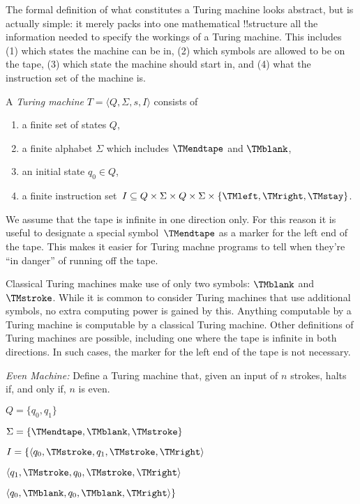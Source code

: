 \documentclass[../../include/open-logic-section]{subfiles}
\begin{document}

\begin{explain}
The formal definition of what constitutes a Turing machine looks
abstract, but is actually simple: it merely packs into one
mathematical !!{structure} all the information needed to specify the
workings of a Turing machine. This includes (1) which states the
machine can be in, (2) which symbols are allowed to be on the tape, (3)
which state the machine should start in, and (4) what the instruction
set of the machine is.
\end{explain}

\begin{defn}
A \emph{Turing machine} $T = \langle Q, \Sigma, s, I\rangle$ consists of
\begin{enumerate}
\item a finite set of states $Q$,
\item a finite alphabet $\Sigma$ which includes $\TMendtape$ and
  $\TMblank$,
\item an initial state $q_0 \in Q$,
\item a finite instruction set~$I \subseteq Q \times \Sigma \times Q
  \times \Sigma \times \{\TMleft, \TMright, \TMstay\}$.
\end{enumerate}
\end{defn}

\begin{explain}
We assume that the tape is infinite in one direction only. For this
reason it is useful to designate a special symbol~$\TMendtape$ as
a marker for the left end of the tape. This makes it easier for
Turing machne programs to tell when they're ``in danger'' of running
off the tape. 

Classical Turing machines make use of only two symbols: $\TMblank$ and
$\TMstroke$. While it is common to consider Turing machines that use additional
symbols, no extra computing power is gained by this. Anything computable by
a Turing machine is computable by a classical Turing machine. Other
definitions of Turing machines are possible,
including one where the tape is infinite in both directions. In such cases,
the marker for the left end of the tape is not necessary.
\end{explain}

\begin{ex}
\emph{Even Machine:} Define a Turing machine that, given an input of $n$
strokes, halts if, and only if, $n$ is even.

$Q =  \{ q_0, q_1 \}$

$\Sigma = \{ \TMendtape, \TMblank, \TMstroke \}$

$I = \{ \langle q_0, \TMstroke, q_1, \TMstroke, \TMright \rangle$

	  $\langle q_1, \TMstroke, q_0, \TMstroke, \TMright \rangle$
	  
	  $\langle q_0, \TMblank, q_0, \TMblank, \TMright \rangle \}$

\end{ex}
\end{document}

